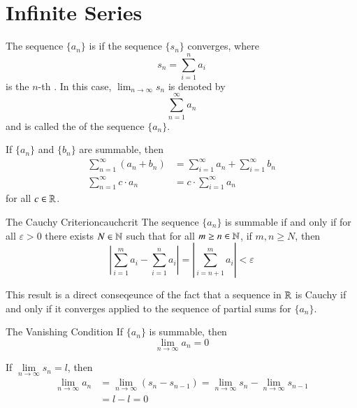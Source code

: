 \documentclass[12pt]{report}
\begin{document}
\section{Infinite Series}

\begin{defn}{}{}
    The sequence $\{a_n\}$ is  if the sequence $\{s_n\}$ converges, where \begin{equation*}
        s_n = \sum\limits_{i=1}^na_i
    \end{equation*}
    is the $n$-th . In this case, $\lim_{n\rightarrow \infty}s_n$ is denoted by \begin{equation*}
        \sum\limits_{n=1}^{\infty}a_n
    \end{equation*}
    and is called the  of the sequence $\{a_n\}$.
\end{defn}

\begin{rmk}{}{}
    If $\{a_n\}$ and $\{b_n\}$ are summable, then \begin{align*}
        \sum\limits_{n=1}^{\infty}(a_n+b_n) &= \sum\limits_{i=1}^{\infty}a_n + \sum\limits_{i=1}^{\infty}b_n \\
        \sum\limits_{n=1}^{\infty}c\cdot a_n &= c\cdot\sum\limits_{i=1}^{\infty}a_n
    \end{align*}
    for all $c \in \mathbb R$. 
\end{rmk}

\begin{namthm}{The Cauchy Criterion}{cauchcrit}
    The sequence $\{a_n\}$ is summable if and only if for all $\varepsilon > 0$ there exists $N \in \mathbb N$ such that for all $m \geq n \in \mathbb N$, if $m,n \geq N$, then \begin{equation*}
        \left|\sum\limits_{i=1}^ma_i - \sum\limits_{i=1}^na_i\right| = \left|\sum\limits_{i=n+1}^ma_i\right| <\varepsilon
    \end{equation*}
\end{namthm}

\begin{rmk}{}{}
    This result is a direct conseqeunce of the fact that a sequence in $\mathbb R$ is Cauchy if and only if it converges applied to the sequence of partial sums for $\{a_n\}$.
\end{rmk}


\begin{namthm}{The Vanishing Condition}{}
    If $\{a_n\}$ is summable, then \begin{equation*}
        \lim\limits_{n\rightarrow \infty}a_n = 0
    \end{equation*}
\end{namthm}
\begin{proof*}{}{}
    If $\lim\limits_{n\rightarrow \infty}s_n = l$, then \begin{align*}
        \lim\limits_{n\rightarrow \infty}a_n &= \lim\limits_{n\rightarrow \infty}(s_n - s_{n-1}) = \lim\limits_{n\rightarrow \infty}s_n - \lim\limits_{n\rightarrow \infty}s_{n-1} \\
        &= l - l = 0
    \end{align*}
\end{proof*}
\end{document}
